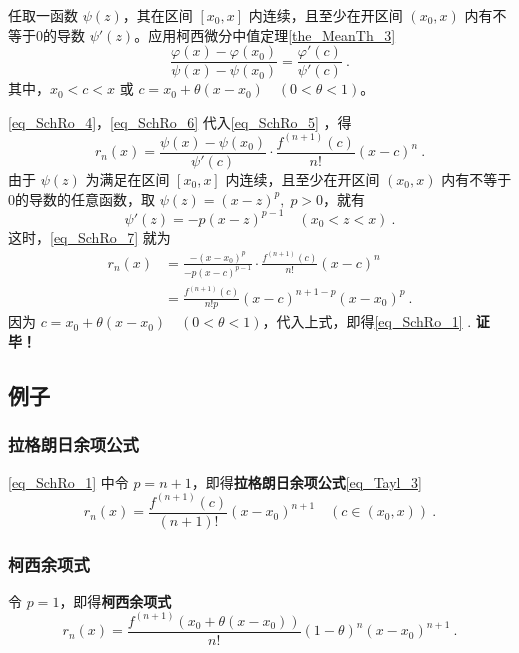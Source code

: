 任取一函数 $\psi(z)$，其在区间 $[x_0,x]$ 内连续，且至少在开区间 $(x_0,x)$ 内有不等于0的导数 $\psi'(z)$。应用柯西微分中值定理\autoref{the_MeanTh_3}~
\begin{equation}\label{eq_SchRo_5}
\frac{\varphi(x)-\varphi(x_0)}{\psi(x)-\psi(x_0)}=\frac{\varphi'(c)}{\psi'(c)}~.
\end{equation}
其中，$x_0<c<x$ 或 $c=x_0+\theta(x-x_0)\quad(0<\theta<1)$。

\autoref{eq_SchRo_4}，\autoref{eq_SchRo_6}  代入\autoref{eq_SchRo_5} ，得
\begin{equation}\label{eq_SchRo_7}
r_n(x)=\frac{\psi(x)-\psi(x_0)}{\psi'(c)}\cdot\frac{f^{(n+1)}(c)}{n!}(x-c)^n~.
\end{equation}
由于 $\psi(z)$ 为满足在区间 $[x_0,x]$ 内连续，且至少在开区间 $(x_0,x)$ 内有不等于0的导数的任意函数，取 $\psi(z)=(x-z)^p,\;p>0$，就有
\begin{equation}
\psi'(z)=-p(x-z)^{p-1}\quad (x_0<z<x)~.
\end{equation}
这时，\autoref{eq_SchRo_7} 就为
\begin{equation}
\begin{aligned}
r_n(x)&=\frac{-(x-x_0)^p}{-p(x-c)^{p-1}}\cdot\frac{f^{(n+1)}(c)}{n!}(x-c)^n\\
&=\frac{f^{(n+1)}(c)}{n!p}(x-c)^{n+1-p}(x-x_0)^p~.
\end{aligned}
\end{equation}
因为 $c=x_0+\theta(x-x_0)\quad(0<\theta<1)$，代入上式，即得\autoref{eq_SchRo_1} .
\textbf{证毕！}

\subsection{例子}
\subsubsection{拉格朗日余项公式}
\autoref{eq_SchRo_1} 中令 $p=n+1$，即得\textbf{拉格朗日余项公式}\autoref{eq_Tayl_3}~
\begin{equation}
r_n(x)=\frac{f^{(n+1)}(c)}{(n+1)!}(x-x_0)^{n+1}\quad (c\in(x_0,x))~.
\end{equation}
\subsubsection{柯西余项式}
令 $p=1$，即得\textbf{柯西余项式}
\begin{equation}
r_n(x)=\frac{f^{(n+1)}(x_0+\theta(x-x_0))}{n!}(1-\theta)^{n}(x-x_0)^{n+1}~.
\end{equation}
